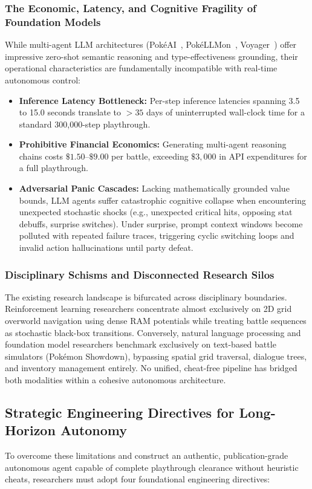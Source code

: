 \documentclass[journal,10pt,twocolumn]{IEEEtran}
\begin{document}
\subsubsection{The Economic, Latency, and Cognitive Fragility of Foundation Models}
While multi-agent LLM architectures (Pok{\'e}AI~\cite{liu2025pokeai}, Pok{\'e}LLMon~\cite{hu2024pokellmon}, Voyager~\cite{wang2023voyager}) offer impressive zero-shot semantic reasoning and type-effectiveness grounding, their operational characteristics are fundamentally incompatible with real-time autonomous control:
\begin{itemize}
    \item \textbf{Inference Latency Bottleneck:} Per-step inference latencies spanning 3.5 to 15.0 seconds translate to $>35$ days of uninterrupted wall-clock time for a standard 300,000-step playthrough.
    \item \textbf{Prohibitive Financial Economics:} Generating multi-agent reasoning chains costs $\$1.50$--$\$9.00$ per battle, exceeding $\$3{,}000$ in API expenditures for a full playthrough.
    \item \textbf{Adversarial Panic Cascades:} Lacking mathematically grounded value bounds, LLM agents suffer catastrophic cognitive collapse when encountering unexpected stochastic shocks (e.g., unexpected critical hits, opposing stat debuffs, surprise switches). Under surprise, prompt context windows become polluted with repeated failure traces, triggering cyclic switching loops and invalid action hallucinations until party defeat.
\end{itemize}

\subsubsection{Disciplinary Schisms and Disconnected Research Silos}
The existing research landscape is bifurcated across disciplinary boundaries. Reinforcement learning researchers concentrate almost exclusively on 2D grid overworld navigation using dense RAM potentials while treating battle sequences as stochastic black-box transitions. Conversely, natural language processing and foundation model researchers benchmark exclusively on text-based battle simulators (Pok{\'e}mon Showdown), bypassing spatial grid traversal, dialogue trees, and inventory management entirely. No unified, cheat-free pipeline has bridged both modalities within a cohesive autonomous architecture.

\subsection{Strategic Engineering Directives for Long-Horizon Autonomy}
To overcome these limitations and construct an authentic, publication-grade autonomous agent capable of complete playthrough clearance without heuristic cheats, researchers must adopt four foundational engineering directives:
\end{document}
